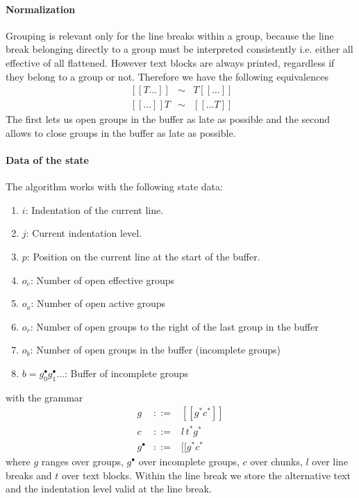 \documentclass[12pt]{article}
\begin{document}
\paragraph{Normalization}
Grouping is relevant only for the line breaks within a group, because the line
break belonging directly to a group must be interpreted consistently
i.e. either all effective of all flattened. However text blocks are always
printed, regardless if they belong to a group or not. Therefore we have the
following equivalences
$$
\begin{array}{lll}
  \ [\![T \ldots]\!] &\sim&  T [\![\ldots]\!]
  \\
  \ [\![\ldots]\!] T &\sim&  [\![\ldots T]\!]

\end{array}
$$
%
The first lets us open groups in the buffer as late as possible and the second
allows to close groups in the buffer as late as possible.


\paragraph{Data of the state} The algorithm works with the following state
data:
\begin{enumerate}
\item $i$: Indentation of the current line.

\item $j$: Current indentation level.

\item $p$: Position on the current line at the start of the buffer.

\item $o_e$: Number of open effective groups

\item $o_a$: Number of open active groups

\item $o_r$: Number of open groups to the right of the last group in the
  buffer

\item $o_b$: Number of open groups in the buffer (incomplete groups)

\item $b = g^\bullet_0 g^\bullet_1 \ldots$: Buffer of incomplete groups
\end{enumerate}
%
with the grammar
$$
\begin{array}{lll}
  g & ::= & [\![ g^* c^* ]\!]
  \\
  c & ::= & l\, t^* g^*
  \\
  g^\bullet & ::= & [\![ g^* c^*
\end{array}
$$
where $g$ ranges over groups, $g^\bullet$ over incomplete groups,
$c$ over chunks, $l$ over line breaks and
$t$ over text blocks. Within the line break we store the alternative text and
the indentation level valid at the line break.
\end{document}
